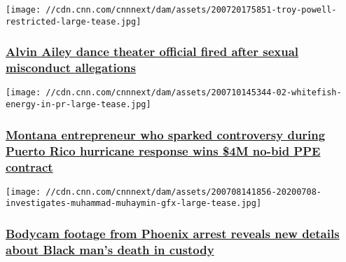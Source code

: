 \href{/2020/07/20/us/alvin-ailey-dance-school-troy-powell-invs/index.html}{}

\texttt{[image: //cdn.cnn.com/cnnnext/dam/assets/200720175851-troy-powell-restricted-large-tease.jpg]}

\hypertarget{alvin-ailey-dance-theater-official-fired-after-sexual-misconduct-allegations}{%
\subsubsection{\texorpdfstring{\href{/2020/07/20/us/alvin-ailey-dance-school-troy-powell-invs/index.html}{Alvin
Ailey dance theater official fired after sexual misconduct
allegations}}{Alvin Ailey dance theater official fired after sexual misconduct allegations}}\label{alvin-ailey-dance-theater-official-fired-after-sexual-misconduct-allegations}}

\href{/2020/07/14/politics/whitefish-montana-ppe-federal-contract-after-puerto-rico-invs/index.html}{}

\texttt{[image: //cdn.cnn.com/cnnnext/dam/assets/200710145344-02-whitefish-energy-in-pr-large-tease.jpg]}

\hypertarget{montana-entrepreneur-who-sparked-controversy-during-puerto-rico-hurricane-response-wins-4m-no-bid-ppe-contract-}{%
\subsubsection{\texorpdfstring{\href{/2020/07/14/politics/whitefish-montana-ppe-federal-contract-after-puerto-rico-invs/index.html}{Montana
entrepreneur who sparked controversy during Puerto Rico hurricane
response wins \$4M no-bid PPE contract
}}{Montana entrepreneur who sparked controversy during Puerto Rico hurricane response wins \$4M no-bid PPE contract }}\label{montana-entrepreneur-who-sparked-controversy-during-puerto-rico-hurricane-response-wins-4m-no-bid-ppe-contract-}}

\href{/2020/07/09/us/phoenix-muhammad-muhaymin-invs/index.html}{}

\texttt{[image: //cdn.cnn.com/cnnnext/dam/assets/200708141856-20200708-investigates-muhammad-muhaymin-gfx-large-tease.jpg]}

\hypertarget{bodycam-footage-from-phoenix-arrest-reveals-new-details-about-black-mans-death-in-custody}{%
\subsubsection{\texorpdfstring{\href{/2020/07/09/us/phoenix-muhammad-muhaymin-invs/index.html}{Bodycam
footage from Phoenix arrest reveals new details about Black man's death
in
custody}}{Bodycam footage from Phoenix arrest reveals new details about Black man's death in custody}}\label{bodycam-footage-from-phoenix-arrest-reveals-new-details-about-black-mans-death-in-custody}}

